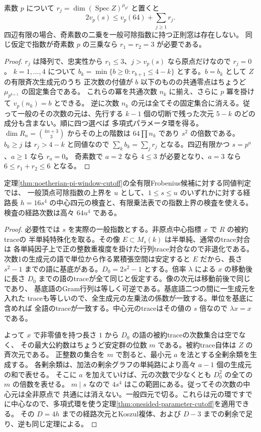 \begin{corollary}\label{cor:central-valuation-strata}
素数 $p$ について $r_j=\dim(\operatorname{Spec} Z)^{\mu_{p^j}}$ と置くと
\[
 2v_p(s)\le v_p(64)+\sum_{j\ge1}r_j .
\]
四辺有限の場合、奇素数の二乗を一般可除指数に持つ正則窓は存在しない。
同じ仮定で指数が奇素数 $p$ の三乗なら $r_1=r_2=3$ が必要である。
\end{corollary}
\begin{proof}
$r_j$ は降列で、忠実性から $r_1\le3$、$j>v_p(s)$ なら原点だけなので $r_j=0$。
$k=1,\ldots,4$ について
$b_k=\min\{b\ge0:r_{b+1}\le4-k\}$ とする。$b=b_k$ として $Z$ の有限斉次生成元のうち
正次数の付値が $b$ 以下のものの共通零点はちょうど $\mu_{p^{b+1}}$ の固定集合である。
これらの冪を共通次数 $n_k$ に揃え、さらに $p$ 冪を掛けて $v_p(n_k)=b$ とできる。
逆に次数 $n_k$ の元は全てその固定集合に消える。従って一般のその次数の元は、先行する
$k-1$ 個の切断で残った次元 $5-k$ のどの成分も含まない。順に四つ選べば
多項式パラメータ環を得る。$\dim R_n=\binom{4n+3}3$ からその上の階数は
$64\prod n_k$ であり $s^2$ の倍数である。$b_k\ge j$ は $r_j>4-k$ と同値なので
$\sum_k b_k=\sum_j r_j$ となる。四辺有限かつ $s=p^a$、$a\ge1$ なら $r_a=0$。
奇素数で $a=2$ なら $4\le3$ が必要となり、$a=3$ なら $6\le r_1+r_2\le6$ となる。
\end{proof}

\begin{corollary}\label{cor:polynomial-pi-window-cutoff}
定理\ref{thm:noetherian-pi-window-cutoff}の全有限Frobenius候補に対する同値判定では、
一般頂点可除指数の上界を $u$ として、$1\le s\le u$ のいずれかに対する経路長
$h=16s^4$ の中心四元の検査と、有限乗法表での指数上界の検査を使える。
検査の経路次数は高々 $64u^4$ である。
\end{corollary}
\begin{proof}
必要性では $s$ を実際の一般指数とする。非原点中心指標 $x$ で $R$ の被約traceの
半単純特殊化を取る。その像 $E\subset M_s(k)$ は半単純、通常のtrace対合は
各単純因子上で正の整数重複度を掛けた行列trace対合なので非退化である。
次数1の生成元の語で単位から作る累積張空間は安定すると $E$ だから、長さ
$s^2-1$ までの語に基底がある。$D_0=2s^2-1$ とする。倍率 $\lambda$ による
$x$ の移動後に長さ $D_0$ までの語のtraceが全て同じと仮定する。像の次元は移動前後で同じであり、
基底語のGram行列は等しく可逆である。基底語二つの間に一生成元を入れた
traceも等しいので、全生成元の左乗法の係数が一致する。単位を基底に含めれば
全語のtraceが一致する。中心元のtraceはその値の $s$ 倍なので $\lambda x=x$ である。

よって $x$ で非零値を持つ長さ $1$ から $D_0$ の語の被約traceの次数集合は空でなく、
その最大公約数はちょうど安定群の位数 $m$ である。被約trace自体は $Z$ の斉次元である。
正整数の集合を $m$ で割ると、最小元 $a$ を法とする全剰余類を生成する。
各剰余類は、加法の剰余グラフの単純路により高々 $a-1$ 個の生成元の和で表せる。
そこに $a$ を加えていけば、元の次数で少なくとも $D_0^2$ の全ての $m$ の倍数を表せる。
$m\mid s$ なので $4s^4$ はこの範囲にある。従ってその次数の中心元は全非原点で
共通には消えない。一般四元で切る。これらは元の環ですでに中心なので、多項式環を使う定理\ref{thm:onesided-parameter-cutoff}を適用できる。
その $D=4h$ までの経路次元とKoszul複体、および $D-3$ までの剰余で足り、逆も同じ定理による。
\end{proof}
